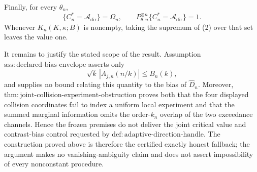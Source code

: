 Finally, for every \(\theta_n\),
\[
 \{C_n^*=\mathcal A_{\mathrm{dir}}\}=\Omega_n,
 \qquad
 P_{\theta,n}^{\otimes n}\{C_n^*=\mathcal A_{\mathrm{dir}}\}=1. \tag{2}
\]
Whenever \(K_n(K,\kappa;B)\) is nonempty, taking the supremum of (2) over that set leaves the value one.

It remains to justify the stated scope of the result.  Assumption \(\mathrm{ass{:}declared\text{-}bias\text{-}envelope}\) asserts only
\[
 \sqrt{k}\,|A_{j,n}(n/k)|\leq B_n(k),
\]
and supplies no bound relating this quantity to the bias of \(\widehat D_n\).  Moreover, \(\mathrm{thm{:}joint\text{-}collision\text{-}experiment\text{-}obstruction}\) proves both that the four displayed collision coordinates fail to index a uniform local experiment and that the summed marginal information omits the order-\(k_n\) overlap of the two exceedance channels.  Hence the frozen premises do not deliver the joint critical value and contrast-bias control requested by \(\mathrm{def{:}adaptive\text{-}direction\text{-}handle}\).  The construction proved above is therefore the certified exactly honest fallback; the argument makes no vanishing-ambiguity claim and does not assert impossibility of every nonconstant procedure.
